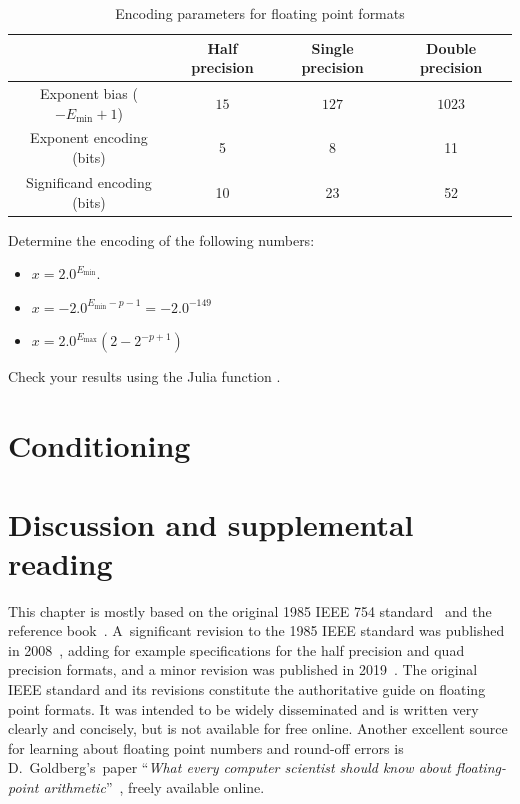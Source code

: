 \begin{table}[ht]
    \centering
    \begin{tabular}{|c|c|c|c|}
        \hline
        & Half precision & Single precision & Double precision
        \\ \hline
        Exponent bias ($-E_{\min} + 1$) & $15$ & $127$ & $1023$
        \\ \hline
        Exponent encoding (bits) & 5 & 8 & 11
        \\ \hline
        Significand encoding (bits) & 10 & 23 & 52
        \\ \hline
    \end{tabular}
    \caption{Encoding parameters for floating point formats}%
    \label{table:floating_point_formats_encoding}
\end{table}

\begin{exercise}
    Determine the encoding of the following  numbers:
    \begin{itemize}
        \item $x = 2.0^{E_{\min}}$.
        \item $x = - 2.0^{E_{\min} - p - 1} = - 2.0^{-149}$
        \item $x = 2.0^{E_{\max}} (2-2^{-p+1})$
    \end{itemize}
    Check your results using the Julia function .
\end{exercise}

\section{Conditioning}%
\label{sec:conditioning}



\section{Discussion and supplemental reading}%
\label{sec:discussion_and_bibliograhpy}
This chapter is mostly based on the original 1985 IEEE 754 standard~\cite{ieee754} and the reference book~\cite{MR2265914}.
A~significant revision to the 1985 IEEE standard was published in 2008~\cite{ieee2008},
adding for example specifications for the half precision and quad precision formats,
and a minor revision was published in 2019~\cite{ieee2019}.
The original IEEE standard and its revisions constitute the authoritative guide on floating point formats.
It was intended to be widely disseminated and is written very clearly and concisely,
but is not available for free online.
Another excellent source for learning about floating point numbers and round-off errors is D.\ Goldberg's~paper ``\emph{What every computer scientist should know about floating-point arithmetic}''~\cite{goldberg1991every},
freely available online.

